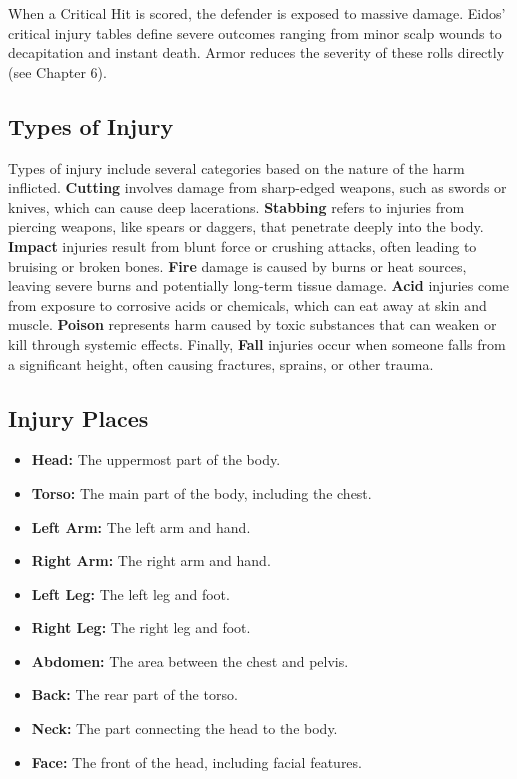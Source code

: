 When a Critical Hit is scored, the defender is exposed to massive damage. Eidos' critical injury tables define severe outcomes ranging from minor scalp wounds to decapitation and instant death. Armor reduces the severity of these rolls directly (see Chapter 6).

\subsection{Types of Injury}

Types of injury include several categories based on the nature of the harm inflicted. \textbf{Cutting} involves damage from sharp-edged weapons, such as swords or knives, which can cause deep lacerations. \textbf{Stabbing} refers to injuries from piercing weapons, like spears or daggers, that penetrate deeply into the body. \textbf{Impact} injuries result from blunt force or crushing attacks, often leading to bruising or broken bones. \textbf{Fire} damage is caused by burns or heat sources, leaving severe burns and potentially long-term tissue damage. \textbf{Acid} injuries come from exposure to corrosive acids or chemicals, which can eat away at skin and muscle. \textbf{Poison} represents harm caused by toxic substances that can weaken or kill through systemic effects. Finally, \textbf{Fall} injuries occur when someone falls from a significant height, often causing fractures, sprains, or other trauma.

\subsection{Injury Places}

\begin{itemize}
    \item \textbf{Head:} The uppermost part of the body.
    \item \textbf{Torso:} The main part of the body, including the chest.
    \item \textbf{Left Arm:} The left arm and hand.
    \item \textbf{Right Arm:} The right arm and hand.
    \item \textbf{Left Leg:} The left leg and foot.
    \item \textbf{Right Leg:} The right leg and foot.
    \item \textbf{Abdomen:} The area between the chest and pelvis.
    \item \textbf{Back:} The rear part of the torso.
    \item \textbf{Neck:} The part connecting the head to the body.
    \item \textbf{Face:} The front of the head, including facial features.
\end{itemize}

